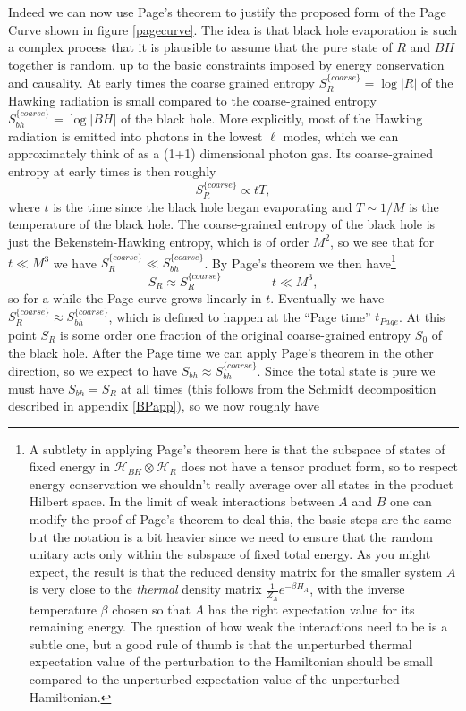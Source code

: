 \documentclass[12pt]{article}
\newcommand{\be}{\begin{equation}}
\newcommand{\ee}{\end{equation}}
\newcommand{\HR}{\mathcal{H}_R}
\begin{document}
Indeed we can now use Page's theorem to justify the proposed form of the Page Curve shown in figure \ref{pagecurve}.  The idea is that black hole evaporation is such a complex process that it is plausible to assume that the pure state of $R$ and $BH$ together is random, up to the basic constraints imposed by energy conservation and causality.  At early times the coarse grained entropy $S_R^{\{coarse\}}=\log|R|$ of the Hawking radiation is small compared to the coarse-grained entropy $S_{\mathit{bh}}^{\{coarse\}}=\log|BH|$ of the black hole.  More explicitly, most of the Hawking radiation is emitted into photons in the lowest $\ell$ modes, which we can approximately think of as a (1+1) dimensional photon gas.  Its coarse-grained entropy at early times is then roughly
\be
S_R^{\{coarse\}}\propto t T,
\ee  
where $t$ is the time since the black hole began evaporating and $T\sim 1/M$ is the temperature of the black hole.  The coarse-grained entropy of the black hole is just the Bekenstein-Hawking entropy, which is of order $M^2$, so we see that for $t\ll M^3$ we have $S_R^{\{coarse\}}\ll S_{\mathit{bh}}^{\{coarse\}}$.  By Page's theorem we then have\footnote{A subtlety in applying Page's theorem here is that the subspace of states of fixed energy in $\mathcal{H}_{BH}\otimes \HR$ does not have a tensor product form, so to respect energy conservation we shouldn't really average over all states in the product Hilbert space.  In the limit of weak interactions between $A$ and $B$ one can modify the proof of Page's theorem to deal this, the basic steps are the same but the notation is a bit heavier since we need to ensure that the random unitary acts only within the subspace of fixed total energy.  As you might expect, the result is  that the reduced density matrix for the smaller system $A$ is very close to the \textit{thermal} density matrix $\frac{1}{Z_A}e^{-\beta H_A}$, with the inverse temperature $\beta$ chosen so that $A$ has the right expectation value for its remaining energy.  The question of how weak the interactions need to be is a subtle one, but a good rule of thumb is that the unperturbed thermal expectation value of the perturbation to the Hamiltonian should be small compared to the unperturbed expectation value of the unperturbed Hamiltonian.}
\be
S_R\approx S_R^{\{coarse\}}\qquad \qquad t\ll M^3,
\ee
so for a while the Page curve grows linearly in $t$.  Eventually we have $S_R^{\{coarse\}}\approx S_{\mathit{bh}}^{\{coarse\}}$, which is defined to happen at the ``Page time'' $t_{Page}$.  At this point $S_R$ is some order one fraction of the original coarse-grained entropy $S_0$ of the black hole.  After the Page time we can apply Page's theorem in the other direction, so we expect to have $S_{\mathit{bh}}\approx S_{\mathit{bh}}^{\{coarse\}}$. Since the total state is pure we must have $S_{\mathit{bh}}=S_{R}$ at all times (this follows from the Schmidt decomposition described in appendix \ref{BPapp}), so we now roughly have 
\end{document}
